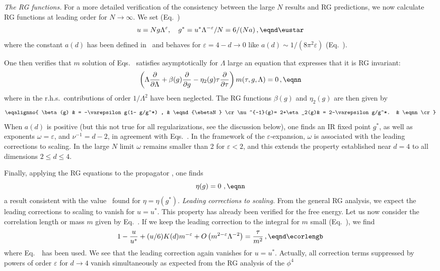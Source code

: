 {\it The RG functions.} For a more detailed verification of the
consistency between the large $N$ results and RG predictions, we now
calculate RG functions at leading order for $N\to\infty $.
We set (Eq.~\eustari)  \sslbl\sssEGRN
$$ u=Ng\Lambda^{\varepsilon},\quad g^*=u^*\Lambda^{-\varepsilon}/N=
6/(Na)\,,\eqnd\eustar $$
where the constant $ a(d) $ has been defined in
\etadepolii\ and behaves for $\varepsilon=4-d\to 0$ like
$ a(d)\sim 1/ (8\pi^2\varepsilon) $ (Eq.~\eaespzero).
\par
One then verifies
that $m$ solution of
Eqs.~\ecorleng{} satisfies asymptotically for $\Lambda$ large an equation that expresses that it is
RG invariant:
$$ \left( \Lambda{ \partial \over \partial \Lambda} +\beta (g){\partial \over \partial g}-\eta_2(g)\tu{\partial
\over \partial \tu} \right) m(\tu,g,\Lambda)=0\,, \eqnn $$
where in the r.h.s.\ contributions of order $1/\Lambda^2$ have been neglected.
The RG functions $\beta(g)$ and $\eta_2(g)$ are then given by
$$ \eqalignno{ \beta (g) & = -\varepsilon g(1- g/g^*) , &
\eqnd{\ebetaN} \cr
\nu^{-1}(g)= 2+\eta_2(g)& = 2-\varepsilon g/g^*. & \eqnn \cr} $$
When $a(d)$ is positive (but this not true for all regularizations,
see the discussion below), one finds an IR fixed point $g^*$, as
well as exponents  $\omega=\varepsilon$, and $\nu^{-1}=d-2$, in
agreement with Eqs.~\eqns{\eNomega,\enuNlim}. In the framework of the
$\varepsilon$-expansion, $\omega$ is associated with the leading
corrections to scaling. In the large $N$ limit $\omega$ remains
smaller than 2 for $\varepsilon<2$, and this extends the property established near $d=4$ to all dimensions $2\le d\le 4$. \par
Finally, applying the RG
equations to the propagator \eDeltasigN, one finds
$$\eta(g)=0\ , \eqnn $$
a result consistent with the value \eetaNg\ found for $\eta=\eta (g^*)$.
\medskip
{\it Leading corrections to scaling.} From the general RG analysis, we
expect the leading corrections to scaling to vanish for $u=u^*$.
This property has already been verified for the free energy. Let us now
consider the correlation length or mass $m$
given by Eq.~\ecorleng{}. If we keep the leading correction to
the integral for $m$ small (Eq.~\etadepolii), we find
$$ 1- {u\over u^*} +(u/6) K(d) m^{-\varepsilon}
+O\left({m^{2-\varepsilon} \Lambda^{-2}}
\right) ={\tu\over m^2}\,, \eqnd\ecorlengb $$
where Eq.~\eustar~has been used.  We see that the leading
correction again vanishes for $u=u^*$. Actually, all correction terms
suppressed by powers of order $\varepsilon$ for $d\to 4$ vanish
simultaneously as expected from the RG analysis of the $\phi^4$
